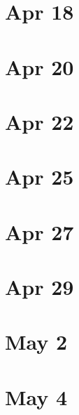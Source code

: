 \documentclass{amsart}
\newcommand{\<}{\langle}
\renewcommand{\>}{\rangle}
\numberwithin{equation}{section}
\theoremstyle{plain}
\theoremstyle{definition}
\theoremstyle{remark}
\begin{document}
\section{Apr 18}

\section{Apr 20}

\section{Apr 22}

\section{Apr 25}

\section{Apr 27}

\section{Apr 29}

\section{May 2}

\section{May 4}




\newpage
\end{document}
